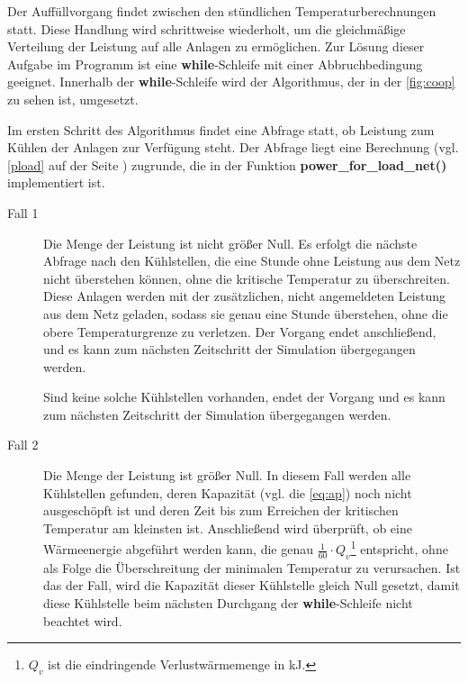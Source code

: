 Der Auff\"ullvorgang findet zwischen den st\"undlichen Temperaturberechnungen
statt. Diese Handlung wird schrittweise wiederholt, um die gleichm\"a\ss ige
Verteilung der Leistung auf alle Anlagen zu erm\"oglichen. Zur L\"osung dieser
Aufgabe im Programm ist eine \textbf{while}-Schleife mit einer Abbruchbedingung
geeignet. Innerhalb der \textbf{while}-Schleife wird der Algorithmus, der in
der \cref{fig:coop} zu sehen ist, umgesetzt.

Im ersten Schritt des Algorithmus findet eine Abfrage statt, ob Leistung zum
K\"uhlen der Anlagen zur Verf\"ugung steht. Der Abfrage liegt eine Berechnung
(vgl. \cref{pload} auf der Seite \pageref{pload}) zugrunde, die in der
Funktion \textbf{power\_for\_load\_net()} implementiert ist.

\begin{description}
\item[Fall 1] Die Menge der Leistung ist nicht gr\"o\ss er Null. Es erfolgt die
n\"achste Abfrage nach den K\"uhlstellen, die eine Stunde ohne Leistung aus dem
Netz nicht \"uberstehen k\"onnen, ohne die kritische Temperatur zu
\"uberschreiten.  Diese Anlagen werden mit der zus\"atzlichen, nicht
angemeldeten Leistung aus dem Netz geladen, sodass sie genau eine Stunde
\"uberstehen, ohne die obere Temperaturgrenze zu verletzen. Der Vorgang endet
anschlie\ss end, und es kann zum n\"achsten Zeitschritt der Simulation
\"ubergegangen werden.

Sind keine solche K\"uhlstellen vorhanden, endet der Vorgang und es kann zum
n\"achsten Zeitschritt der Simulation \"ubergegangen werden.

\item[Fall 2] Die Menge der Leistung ist gr\"o\ss er Null. In diesem Fall werden
alle K\"uhlstellen gefunden, deren Kapazit\"at (vgl. die \cref{eq:ap}) noch
nicht ausgesch\"opft ist und deren Zeit bis zum Erreichen der kritischen
Temperatur am kleinsten ist.  Anschlie\ss end wird \"uberpr\"uft, ob eine
W\"armeenergie abgef\"uhrt werden kann, die genau $\frac{1}{60}\cdot
Q_v$\footnote{ $Q_v$ ist die eindringende Verlustw\"armemenge in kJ.}
entspricht, ohne als Folge die \"Uberschreitung der minimalen Temperatur zu
verursachen. Ist das der Fall, wird die Kapazit\"at dieser K\"uhlstelle gleich
Null gesetzt, damit diese K\"uhlstelle beim n\"achsten Durchgang der
\textbf{while}-Schleife nicht beachtet wird.


\end{description}
